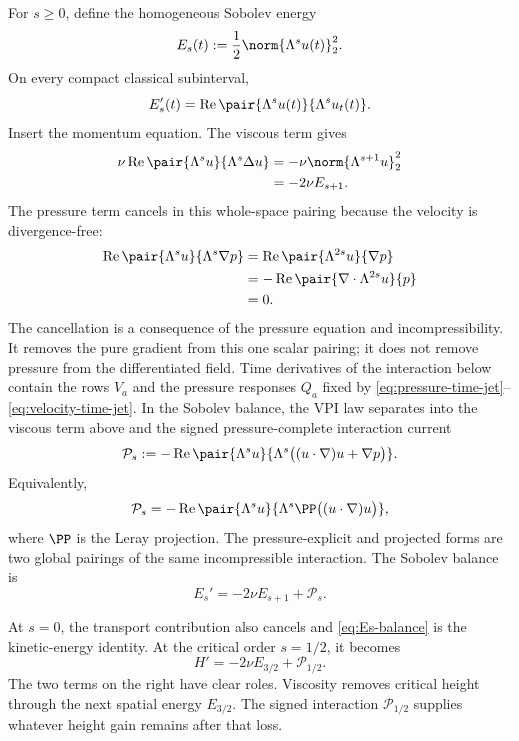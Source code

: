 For \(s\ge0\), define the homogeneous Sobolev energy
\begin{equation*}
 E_s(t):=\frac12\norm{\Lambda^su(t)}_2^2.
\end{equation*}
On every compact classical subinterval,
\begin{equation*}
 E_s'(t)
 =\operatorname{Re}
  \pair{\Lambda^su(t)}{\Lambda^su_t(t)}.
\end{equation*}
Insert the momentum equation.  The viscous term gives
\begin{align*}
 \nu\operatorname{Re}
 \pair{\Lambda^su}{\Lambda^s\Delta u}
 &=-\nu\norm{\Lambda^{s+1}u}_2^2
 \\
 &=-2\nu E_{s+1}.
\end{align*}
The pressure term cancels in this whole-space pairing because the velocity is
divergence-free:
\begin{align*}
 \operatorname{Re}
 \pair{\Lambda^su}{\Lambda^s\nabla p}
 &=\operatorname{Re}
 \pair{\Lambda^{2s}u}{\nabla p}
 \\
 &=-\operatorname{Re}
 \pair{\nabla\cdot\Lambda^{2s}u}{p}
 \\
 &=0.
\end{align*}
The cancellation is a consequence of the pressure equation and
incompressibility.  It removes the pure gradient from this one scalar pairing;
it does not remove pressure from the differentiated field.  Time derivatives
of the interaction below contain the rows \(V_a\) and the pressure responses
\(Q_a\) fixed by \eqref{eq:pressure-time-jet}--\eqref{eq:velocity-time-jet}.
In the Sobolev balance, the VPI law separates into the viscous term above and
the signed pressure-complete interaction current
\begin{equation*}
 \mathcal P_s
 :=-\operatorname{Re}
 \pair{\Lambda^su}
 {\Lambda^s\bigl((u\cdot\nabla)u+\nabla p\bigr)}.
\end{equation*}
Equivalently,
\begin{equation*}
 \mathcal P_s
 =-\operatorname{Re}
 \pair{\Lambda^su}
 {\Lambda^s\PP\bigl((u\cdot\nabla)u\bigr)},
\end{equation*}
where \(\PP\) is the Leray projection.  The pressure-explicit and projected
forms are two global pairings of the same incompressible interaction.  The
Sobolev balance is
\begin{equation}
 E_s'=-2\nu E_{s+1}+\mathcal P_s.
 \label{eq:Es-balance}
\end{equation}

At \(s=0\), the transport contribution also cancels and
\eqref{eq:Es-balance} is the kinetic-energy identity.  At the critical order
\(s=1/2\), it becomes
\begin{equation}
 H'=-2\nu E_{3/2}+\mathcal P_{1/2}.
 \label{eq:H1}
\end{equation}
The two terms on the right have clear roles.  Viscosity removes critical
height through the next spatial energy \(E_{3/2}\).  The signed interaction
\(\mathcal P_{1/2}\) supplies whatever height gain remains after that loss.

